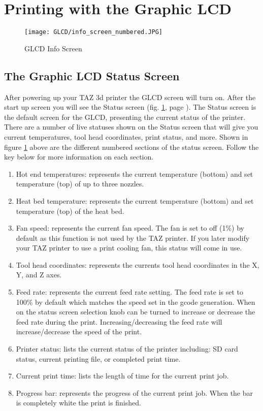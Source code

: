\section{Printing with the Graphic LCD}
\begin{figure}[b]
\centering
\texttt{[image: GLCD/info\_screen\_numbered.JPG]}
\caption{GLCD Info Screen}
\label{fig:info_screen}
\end{figure}

\subsection{The Graphic LCD Status Screen}
After powering up your TAZ 3d printer the GLCD screen will turn on. After the start up screen you will see the Status screen (fig. \ref{fig:info_screen}, page \pageref{fig:info_screen}). The Status screen is the default screen for the GLCD, presenting the current status of the printer. There are a number of live statuses shown on the Status screen that will give you current temperatures, tool head coordinates, print status, and more. Shown in figure \ref{fig:info_screen} above are the different numbered sections of the status screen. Follow the key below for more information on each section.

\begin{enumerate}
\item Hot end temperatures: represents the current temperature (bottom) and set temperature (top) of up to three nozzles.
\item Heat bed temperature: represents the current temperature (bottom) and set temperature (top) of the heat bed.
\item Fan speed: represents the current fan speed. The fan is set to off (1\%) by default as this function is not used by the TAZ printer. If you later modify your TAZ printer to use a print cooling fan, this status will come in use.
\item Tool head coordinates: represents the currents tool head coordinates in the X, Y, and Z axes.
\item Feed rate: represents the current feed rate setting. The feed rate is set to 100\% by default which matches the speed set in the gcode generation. When on the status screen selection knob can be turned to increase or decrease the feed rate during the print. Increasing/decreasing the feed rate will increase/decrease the speed of the print.
\item Printer status: lists the current status of the printer including: SD card status, current printing file, or completed print time.
\item Current print time: lists the length of time for the current print job.
\item Progress bar: represents the progress of the current print job. When the bar is completely white the print is finished.
\end{enumerate}


